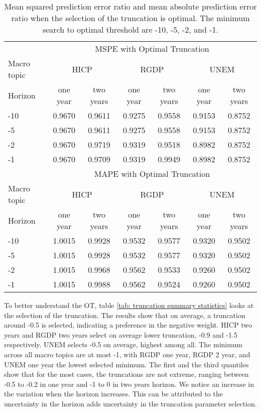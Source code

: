 \documentclass[11pt]{article}
\begin{document}
\begin{table}[!h]
	\centering
	\caption{Mean squared prediction error ratio and mean absolute prediction error ratio when the selection of the truncation is optimal. The minimum search to optimal threshold are -10, -5, -2, and -1.}
	\label{tab: oos mspe}
	\begin{tabular}{lcccccc}
		\hline
		&\multicolumn{6}{c}{MSPE with Optimal Truncation}\\
		\cmidrule(lr){2-7}
		Macro topic & \multicolumn{2}{c}{HICP} & \multicolumn{2}{c}{RGDP} & \multicolumn{2}{c}{UNEM} \\
		\cmidrule(lr){2-3} \cmidrule(lr){4-5}\cmidrule(lr){6-7}
		Horizon     & one year & two years & one year & two years & one year & two years \\ 
		\hline
		-10 & 0.9670   & 0.9611   & 0.9275   & 0.9558   & 0.9153   & 0.8752   \\ 
		-5  & 0.9670   & 0.9611   & 0.9275   & 0.9558   & 0.9153   & 0.8752   \\ 
		-2  & 0.9670   & 0.9719   & 0.9319   & 0.9518   & 0.8982   & 0.8752   \\ 
		-1  & 0.9670   & 0.9709   & 0.9319   & 0.9949   & 0.8982   & 0.8752   \\ 
		\hline
		&\multicolumn{6}{c}{MAPE with Optimal Truncation}\\
		\cmidrule(lr){2-7}
		Macro topic & \multicolumn{2}{c}{HICP} & \multicolumn{2}{c}{RGDP} & \multicolumn{2}{c}{UNEM} \\
		\cmidrule(lr){2-3} \cmidrule(lr){4-5}\cmidrule(lr){6-7}
		Horizon     & one year & two years & one year & two years & one year & two years \\ 
		\hline
		-10 & 1.0015   & 0.9928   & 0.9532   & 0.9577   & 0.9320   & 0.9502   \\
		-5  & 1.0015   & 0.9928   & 0.9532   & 0.9577   & 0.9320   & 0.9502   \\
		-2  & 1.0015   & 0.9968   & 0.9562   & 0.9533   & 0.9260   & 0.9502   \\
		-1  & 1.0015   & 0.9988   & 0.9562   & 0.9524   & 0.9260   & 0.9502   \\
		\hline
	\end{tabular}
\end{table}

To better understand the OT, table \ref{tab: truncation summary statistics} looks at the selection of the truncation. The results show that on average, a truncation around -0.5 is selected, indicating a preference in the negative weight. HICP two years and RGDP two years select on average lower truncation, -0.9 and -1.5 respectively. UNEM selects -0.5 on average, highest among all. The minimum across all macro topics are at most -1, with RGDP one year, RGDP 2 year, and UNEM one year the lowest selected minimum. The first and the third quantiles show that for the most cases, the truncations are not extreme, ranging between -0.5 to -0.2 in one year and -1 to 0 in two years horizon. We notice an increase in the variation when the horizon increases. This can be attributed to the uncertainty in the horizon adds uncertainty in the truncation parameter selection.
\end{document}
